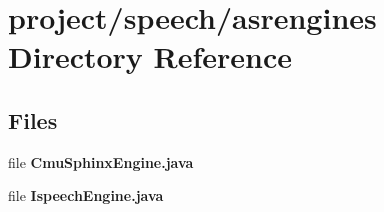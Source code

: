 \section{project/speech/asrengines Directory Reference}
\label{dir_762fe6b473ce3abfc35c75084fccea2c}
\subsection*{Files}
\begin{DoxyCompactItemize}
\item 
file {\bfseries Cmu\+Sphinx\+Engine.\+java}
\item 
file {\bfseries Ispeech\+Engine.\+java}
\end{DoxyCompactItemize}
